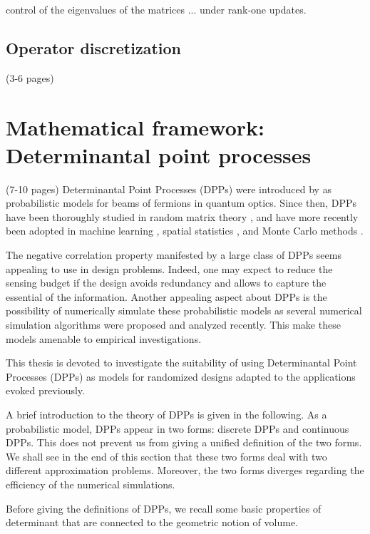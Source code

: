 \documentclass[twoside,11pt]{book}
\numberwithin{theorem}{chapter}
\numberwithin{definition}{chapter}
\numberwithin{proposition}{chapter}
\numberwithin{corollary}{chapter}
\numberwithin{example}{chapter}
\numberwithin{lemma}{chapter}
\begin{document}
control of the eigenvalues of the matrices ... under rank-one updates.


\subsection{Operator discretization}
(3-6 pages)
\section{Mathematical framework: Determinantal point processes}
(7-10 pages)
  Determinantal Point Processes (DPPs) were introduced by \cite{Mac75} as probabilistic models for beams of fermions in quantum optics. Since then, DPPs have been thoroughly studied in random matrix theory \citep{Joh05}, and have more recently been adopted in machine learning \citep*{KuTa12}, spatial statistics \citep*{LaMoRu15}, and Monte Carlo methods \citep{BaHa16}.

The negative correlation property manifested by a large class of DPPs seems appealing to use in design problems. Indeed, one may expect to reduce the sensing budget if the design avoids redundancy and allows to capture the essential of the information. 
Another appealing aspect about DPPs is the possibility of numerically simulate these probabilistic models as several numerical simulation algorithms were proposed and analyzed recently. This make these models amenable to empirical investigations.
 

This thesis is devoted to investigate the suitability of using Determinantal Point Processes (DPPs) as models for randomized designs adapted to the applications evoked previously.

A brief introduction to the theory of DPPs is given in the following. As a probabilistic model, DPPs appear in two forms: discrete DPPs and continuous DPPs. This does not prevent us from giving a unified definition of the two forms. We shall see in the end of this section that these two forms deal with two different approximation problems. Moreover, the two forms diverges regarding the efficiency of the numerical simulations.

Before giving the definitions of DPPs, we recall some basic properties of determinant that are connected to the geometric notion of volume.
\end{document}
